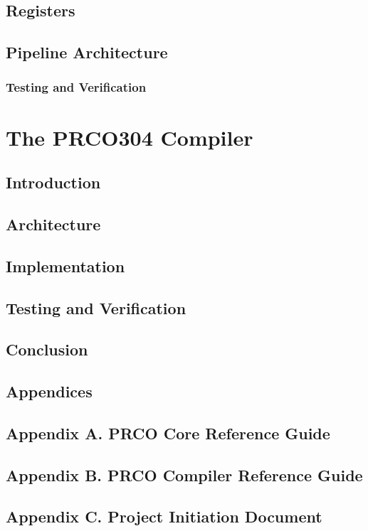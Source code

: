 \documentclass[11pt,a4paper]{report}
\newcommand{\scname}{PRCO304}
\begin{document}
\section{Registers}
\section{Pipeline Architecture}

\subsection{Testing and Verification}

\chapter{The \scname{} Compiler}
\section{Introduction}
\section{Architecture}
\section{Implementation}
\section{Testing and Verification}

\section{Conclusion}

\section{Appendices}
\section{Appendix A. PRCO Core Reference Guide}
\section{Appendix B. PRCO Compiler Reference Guide}
\section{Appendix C. Project Initiation Document}

\newpage
 
\end{document}
